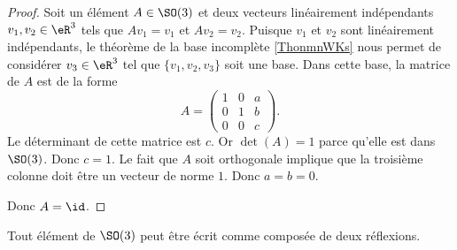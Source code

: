 \begin{proof}
	Soit un élément \( A\in \SO(3)\) et deux vecteurs linéairement indépendants \( v_1,v_2\in \eR^3\) tels que \( Av_1=v_1\) et \( Av_2=v_2\). Puisque \( v_1\) et \( v_2\) sont linéairement indépendants, le théorème de la base incomplète \ref{ThonmnWKs} nous permet de considérer \( v_3\in \eR^3\) tel que \( \{ v_1,v_2,v_3 \}\) soit une base. Dans cette base, la matrice de \( A\) est de la forme
	\begin{equation}
		A=\begin{pmatrix}
			1 & 0 & a \\
			0 & 1 & b \\
			0 & 0 & c
		\end{pmatrix}.
	\end{equation}
	Le déterminant de cette matrice est \( c\). Or \( \det(A)=1\) parce qu'elle est dans \( \SO(3)\). Donc \( c=1\). Le fait que \( A\) soit orthogonale implique que la troisième colonne doit être un vecteur de norme \( 1\). Donc \( a=b=0\).

	Donc \( A=\id\).
\end{proof}

\begin{corollary}       \label{CORooJCURooSRzSFb}
	Tout élément de \( \SO(3)\) peut être écrit comme composée de deux réflexions.
\end{corollary}

